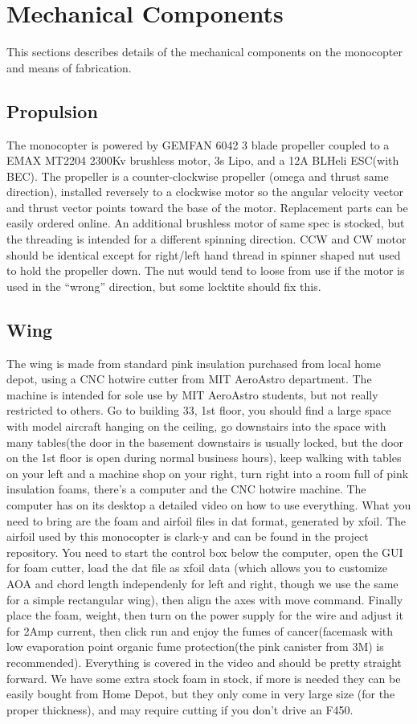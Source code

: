 \documentclass[12pt]{article}
\begin{document}
\section{Mechanical Components}
This sections describes details of the mechanical components on the monocopter and means of fabrication.
\subsection{Propulsion}
The monocopter is powered by GEMFAN 6042 3 blade propeller coupled to a EMAX MT2204 2300Kv brushless motor, 3s Lipo, and a 12A BLHeli ESC(with BEC). The propeller is a counter-clockwise propeller (omega and thrust same direction), installed reversely to a clockwise motor so the angular velocity vector and thrust vector points toward the base of the motor.  Replacement parts can be easily ordered online. An additional brushless motor of same spec is stocked, but the threading is intended for a different spinning direction. CCW and CW motor should be identical except for right/left hand thread in spinner shaped nut used to hold the propeller down. The nut would tend to loose from use if the motor is used in the ``wrong'' direction, but some locktite should fix this. 

\subsection{Wing}
The wing is made from standard pink insulation purchased from local home depot, using a CNC hotwire cutter from MIT AeroAstro department. The machine is intended for sole use by MIT AeroAstro students, but not really restricted to others. Go to building 33, 1st floor, you should find a large space with model aircraft hanging on the ceiling, go downstairs into the space with many tables(the door in the basement downstairs is usually locked, but the door on the 1st floor is open during normal business hours), keep walking with tables on your left and a machine shop on your right, turn right into a room full of pink insulation foams, there's a computer and the CNC hotwire machine. The computer has on its desktop a detailed video on how to use everything. What you need to bring are the foam and airfoil files in dat format, generated by xfoil. The airfoil used by this monocopter is clark-y and can be found in the project repository. You need to start the control box below the computer, open the GUI for foam cutter, load the dat file as xfoil data (which allows you to customize AOA and chord length independenly for left and right, though we use the same for a simple rectangular wing), then align the axes with move command. Finally place the foam, weight, then turn on the power supply for the wire and adjust it for 2Amp current, then click run and enjoy the fumes of cancer(facemask with low evaporation point organic fume protection(the pink canister from 3M) is recommended). Everything is covered in the video and should be pretty straight forward. We have some extra stock foam in stock, if more is needed they can be easily bought from Home Depot, but they only come in very large size (for the proper thickness), and may require cutting if you don't drive an F450.
\end{document}
